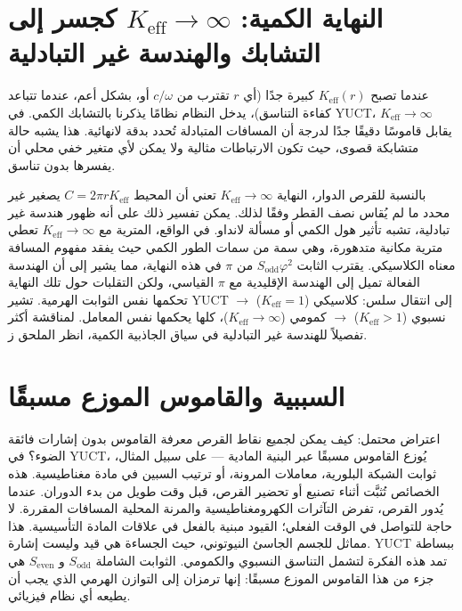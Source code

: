 \documentclass[12pt,a4paper]{article}
\newcommand{\Sodd}{S_{\mathrm{odd}}}
\newcommand{\Seven}{S_{\mathrm{even}}}
\begin{document}
	\section{النهاية الكمية: \(K_{\mathrm{eff}} \to \infty\) كجسر إلى التشابك والهندسة غير التبادلية}
	\label{sec:quantum-limit}
	
	عندما تصبح \(K_{\mathrm{eff}}(r)\) كبيرة جدًا (أي \(r\) تقترب من \(c/\omega\) أو، بشكل أعم، عندما تتباعد كفاءة التناسق)، يدخل النظام نظامًا يذكرنا بالتشابك الكمي. في YUCT، \(K_{\mathrm{eff}} \to \infty\) يقابل قاموسًا دقيقًا جدًا لدرجة أن المسافات المتبادلة تُحدد بدقة لانهائية. هذا يشبه حالة متشابكة قصوى، حيث تكون الارتباطات مثالية ولا يمكن لأي متغير خفي محلي أن يفسرها بدون تناسق.
	
	بالنسبة للقرص الدوار، النهاية \(K_{\mathrm{eff}} \to \infty\) تعني أن المحيط \(C = 2\pi r K_{\mathrm{eff}}\) يصغير غير محدد ما لم يُقاس نصف القطر وفقًا لذلك. يمكن تفسير ذلك على أنه ظهور هندسة غير تبادلية، تشبه تأثير هول الكمي أو مسألة لانداو. في الواقع، المترية مع \(K_{\mathrm{eff}} \to \infty\) تعطي مترية مكانية متدهورة، وهي سمة من سمات الطور الكمي حيث يفقد مفهوم المسافة معناه الكلاسيكي. يقترب الثابت \(\Sodd \varphi^2\) من \(\pi\) في هذه النهاية، مما يشير إلى أن الهندسة الفعالة تميل إلى الهندسة الإقليدية مع \(\pi\) القياسي، ولكن التقلبات حول تلك النهاية تحكمها نفس الثوابت الهرمية. تشير YUCT إلى انتقال سلس: كلاسيكي (\(K_{\mathrm{eff}}=1\)) \(\rightarrow\) نسبوي (\(K_{\mathrm{eff}}>1\)) \(\rightarrow\) كمومي (\(K_{\mathrm{eff}}\to\infty\))، كلها يحكمها نفس المعامل. لمناقشة أكثر تفصيلاً للهندسة غير التبادلية في سياق الجاذبية الكمية، انظر الملحق ز.
	
	\section{السببية والقاموس الموزع مسبقًا}
	\label{sec:causality}
	
	اعتراض محتمل: كيف يمكن لجميع نقاط القرص معرفة القاموس بدون إشارات فائقة الضوء؟ في YUCT، يُوزع القاموس مسبقًا عبر البنية المادية — على سبيل المثال، ثوابت الشبكة البلورية، معاملات المرونة، أو ترتيب السبين في مادة مغناطيسية. هذه الخصائص تُثبَّت أثناء تصنيع أو تحضير القرص، قبل وقت طويل من بدء الدوران. عندما يُدور القرص، تفرض التآثرات الكهرومغناطيسية والمرنة المحلية المسافات المقررة. لا حاجة للتواصل في الوقت الفعلي؛ القيود مبنية بالفعل في علاقات المادة التأسيسية. هذا مماثل للجسم الجاسئ النيوتوني، حيث الجساءة هي قيد وليست إشارة. YUCT ببساطة تمد هذه الفكرة لتشمل التناسق النسبوي والكمومي. الثوابت الشاملة \(\Sodd\) و \(\Seven\) هي جزء من هذا القاموس الموزع مسبقًا: إنها ترمزان إلى التوازن الهرمي الذي يجب أن يطيعه أي نظام فيزيائي.
	
\end{document}
